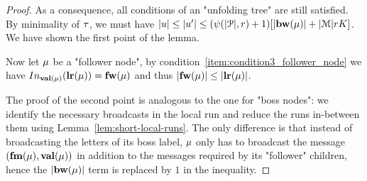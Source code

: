 \begin{proof}
	As a consequence, all conditions of an "unfolding tree" are still satisfied. 
	By minimality of $\tau$, we must have $\size{u} \leq \size{u'} \leq (\towerfun(\size{\prot}, r) +1) \Large[\size{\bosslabel{\node}}+ \size{\messages}rK\Large]$. We have shown the first point of the lemma.
	
	Now let $\mu$ be a "follower node", by condition~\ref{item:condition3_follower_node} we have $\vinput{\valuelabel{\node}}{\localrunlabel{\node}} = \followlabelword{\node}$ and thus $|\mathbf{fw}(\mu)| \leq |\mathbf{lr}(\mu)|$.
	
	The proof of the second point is analogous to the one for "boss nodes": we identify the necessary broadcasts in the local run and reduce the runs in-between them using Lemma~\ref{lem:short-local-runs}. The only difference is that instead of broadcasting the letters of its boss label, $\mu$ only has to broadcast the message $(\mathbf{fm}(\mu), \mathbf{val}(\mu))$ in addition to the messages required by its "follower" children, hence the $|\mathbf{bw}(\mu)|$ term is replaced by $1$ in the inequality.
\end{proof}


